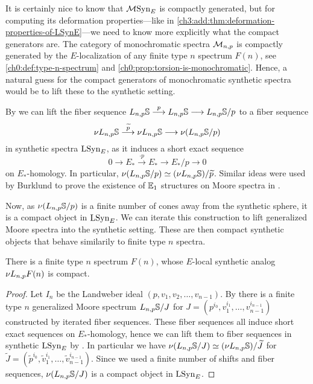 It is certainly nice to know that $\mathcal{M}\mathrm{Syn}_{E}$ is compactly generated, but for computing its deformation properties---like in \cref{ch3:add:thm:deformation-properties-of-LSynE}---we need to know more explicitly what the compact generators are. The category of monochromatic spectra $\mathcal{M}_{n,p}$ is compactly generated by the $E$-localization of any finite type $n$ spectrum $F(n)$, see \cref{ch0:def:type-n-spectrum} and \cref{ch0:prop:torsion-is-monochromatic}. Hence, a natural guess for the compact generators of monochromatic synthetic spectra would be to lift these to the synthetic setting. 

\begin{construction}
    By \cite[4.23]{pstragowski_2022} we can lift the fiber sequence $L_{n,p}\mathbb{S}\overset{p}{\longrightarrow} L_{n,p}\mathbb{S}\longrightarrow L_{n,p}\mathbb{S}/p$ to a fiber sequence 
    \[\nu L_{n,p}\mathbb{S} \overset{\widetilde{p}}{\longrightarrow} \nu L_{n,p}\mathbb{S}\longrightarrow \nu (L_{n,p}\mathbb{S}/p)\] 
    in synthetic spectra $\mathrm{LSyn}_{E}$, as it induces a short exact sequence 
    \[0\to E_{*} \overset{\cdot p}\to E_{*}\to E_{*}/p\to 0\]
    on $E_{*}$-homology. In particular, $\nu (L_{n,p}\mathbb{S}/p)\simeq (\nu L_{n,p}\mathbb{S})/\widetilde{p}$. Similar ideas were used by Burklund to prove the existence of $\mathbb{E}_1$ structures on Moore spectra in \cite{burklund_2022}. 
    
    Now, as $\nu (L_{n,p}\mathbb{S}/p)$ is a finite number of cones away from the synthetic sphere, it is a compact object in $\mathrm{LSyn}_{E}$. We can iterate this construction to lift generalized Moore spectra into the synthetic setting. These are then compact synthetic objects that behave similarily to finite type $n$ spectra. 
\end{construction}

\begin{lemma}
    There is a finite type $n$ spectrum $F(n)$, whose $E$-local synthetic analog $\nu L_{n,p} F(n)$ is compact. 
\end{lemma}
\begin{proof}
    Let $I_n$ be the Landweber ideal $(p,v_1, v_2, \ldots, v_{n-1})$. By \cite[4.14]{hovey-strickland_99} there is a finite type $n$ generalized Moore spectrum $L_{n,p}\mathbb{S}/J$ for $J=(p^{i_0}, v_1^{i_1}, \ldots, v_{n-1}^{i_{n-1}})$ constructed by iterated fiber sequences. These fiber sequences all induce short exact sequences on $E_{*}$-homology, hence we can lift them to fiber sequences in synthetic $\mathrm{LSyn}_{E}$ by \cite[4.23]{pstragowski_2022}. In particular we have $\nu (L_{n,p}\mathbb{S}/J) \simeq (\nu L_{n,p}\mathbb{S})/\widetilde{J}$ for $\widetilde{J} = (\widetilde{p}^{i_0}, \widetilde{v}_1^{i_1}, \ldots, \widetilde{v}_{n-1}^{i_{n-1}})$. Since we used a finite number of shifts and fiber sequences, $\nu (L_{n,p}\mathbb{S}/J)$ is a compact object in $\mathrm{LSyn}_{E}$. 
\end{proof}

